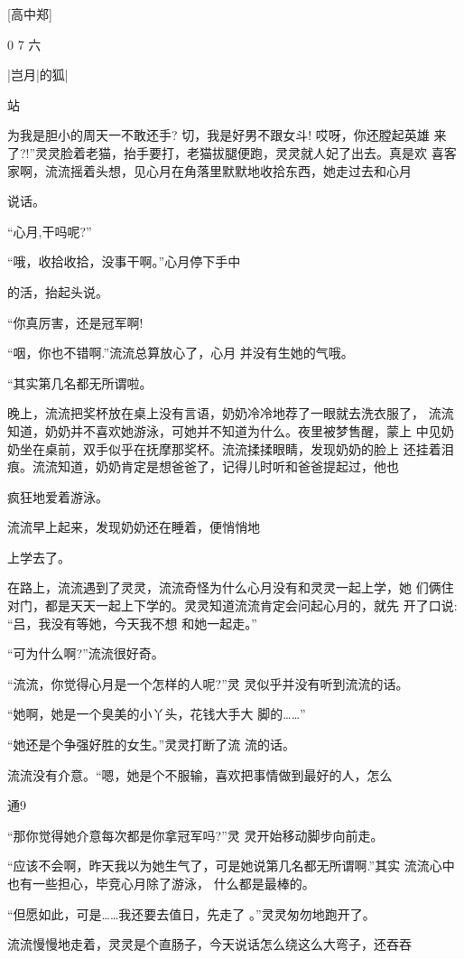 \documentclass{article}
\begin{document}
[高中郑] 


0  7 六 


|岂月|的狐|

站 

为我是胆小的周天一不敢还手? 切，我是好男不跟女斗! 哎呀，你还膛起英雄
来了?!”灵灵脸着老猫，抬手要打，老猫拔腿便跑，灵灵就人妃了出去。真是欢
喜客家啊，流流摇着头想，见心月在角落里默默地收拾东西，她走过去和心月

说话。 


“心月,干吗呢?” 

“哦，收拾收拾，没事干啊。”心月停下手中
\newpage

的活，抬起头说。 


“你真厉害，还是冠军啊! 

“咽，你也不错啊.”流流总算放心了，心月
并没有生她的气哦。 


“其实第几名都无所谓啦。 

晚上，流流把奖杯放在桌上没有言语，奶奶冷冷地荐了一眼就去洗衣服了，
流流知道，奶奶并不喜欢她游泳，可她并不知道为什么。夜里被梦售醒，蒙上
中见奶奶坐在桌前，双手似乎在抚摩那奖杯。流流揉揉眼睛，发现奶奶的脸上
还挂着泪痕。流流知道，奶奶肯定是想爸爸了，记得儿时听和爸爸提起过，他也

疯狂地爱着游泳。 

流流早上起来，发现奶奶还在睡着，便悄悄地

\newpage
上学去了。 

在路上，流流遇到了灵灵，流流奇怪为什么心月没有和灵灵一起上学，她
们俩住对门，都是天天一起上下学的。灵灵知道流流肯定会问起心月的，就先
开了口说: “吕，我没有等她，今天我不想
和她一起走。” 


“可为什么啊?”流流很好奇。 

“流流，你觉得心月是一个怎样的人呢?”灵
灵似乎并没有听到流流的话。 

“她啊，她是一个臭美的小丫头，花钱大手大
脚的……” 

“她还是个争强好胜的女生。”灵灵打断了流
流的话。 

流流没有介意。“嗯，她是个不服输，喜欢把事情做到最好的人，怎么
\newpage


通9 

“那你觉得她介意每次都是你拿冠军吗?”灵
灵开始移动脚步向前走。 

“应该不会啊，昨天我以为她生气了，可是她说第几名都无所谓啊.”其实
流流心中也有一些担心，毕竞心月除了游泳，
什么都是最棒的。 

“但愿如此，可是……我还要去值日，先走了
。”灵灵匆勿地跑开了。 

流流慢慢地走着，灵灵是个直肠子，今天说话怎么绕这么大弯子，还吞吞
\end{document}
